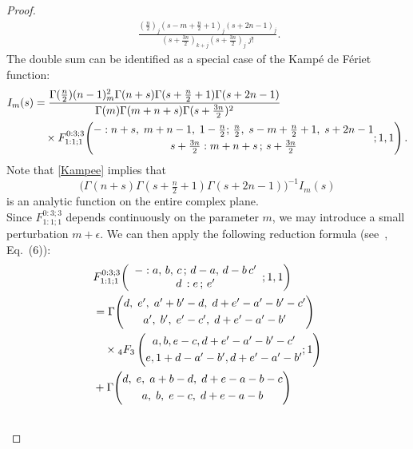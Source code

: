 \documentclass{article}
\theoremstyle{boldremark}
\renewcommand\[{\begin{equation}}
\renewcommand\]{\end{equation}}
\theoremstyle{definition}
\numberwithin{equation}{section}
\begin{document}
\begin{proof}
\begin{align*}
\;
\frac{
\left(\frac{n}{2}\right)_j
\left(s-m+\frac{n}{2}+1\right)_j
\left(s+2n-1\right)_j
}{
\left(s+\frac{3n}{2}\right)_{k+j}
\left(s+\frac{3n}{2}\right)_j\; j!
}.
\end{align*}
The double sum can be identified as a special case of the Kampé de Fériet function:
\begin{align}
I_m(s)
&= \frac{\Gamma(\frac{n}{2}) (n-1)_m^2 \Gamma(n+s)
\Gamma(s+\frac{n}{2}+1) \Gamma(s+2n-1)}
{\Gamma(m) \Gamma(m+n+s) \Gamma(s+\frac{3n}{2})^2}
\label{Kampee}\\
&\quad \times
F^{0:3;3}_{1:1;1}\!\left(
\begin{matrix}
-:n+s,\;m+n-1,\;1-\frac{n}{2};
\,\frac{n}{2},\;s-m+\frac{n}{2}+1,\;s+2n-1\\[3pt]
s+\frac{3n}{2}: m+n+s\, ; \,s+\frac{3n}{2}
\end{matrix}
; 1,1\right).
\notag
\end{align}
Note that \eqref{Kampee} implies that
$$
\bigl(\Gamma(n+s)\Gamma(s+\tfrac n2+1)\Gamma(s+2n-1)\bigr)^{-1} I_m(s)
$$
is an analytic function on the entire complex plane.\\
Since \(F^{0:3;3}_{1:1;1}\) depends continuously on the parameter \(m\), we may introduce a small perturbation \(m+\epsilon\). We can then apply the following reduction formula (see~\cite{pitre1996}, Eq.~(6)):
\begin{align}\label{redukce}
    & F^{0:3;3}_{1:1;1} \! \left(
  \begin{array}{c}
    - : a,\, b,\, c \, ; \, d - a,\, d-b \, c' \\
    d\, : e \, ; \, e'
  \end{array}
  ; 1, 1 \right)\\\nonumber
    & = \Gamma\!\left(
\begin{matrix}
d,\; e',\; a'+b'-d,\; d+e'-a'-b'-c'
\\[3pt]
a',\; b',\; e'-c',\; d+e'-a'-b'
\end{matrix}
\right) \\\notag
&\quad \times {}_4F_3 \left( \begin{matrix} a, b, e-c, d+e'-a'-b'-c' \\[3pt] e, 1+d-a'-b', d+e'-a'-b' \end{matrix} ; 1 \right) \\\nonumber
&+ \Gamma\!\left(
\begin{matrix}
d,\; e,\; a+b-d,\; d+e-a-b-c
\\[3pt]
a,\; b,\; e-c,\; d+e-a-b
\end{matrix}
\right) \\\nonumber

\end{align}
\end{proof}
\end{document}
